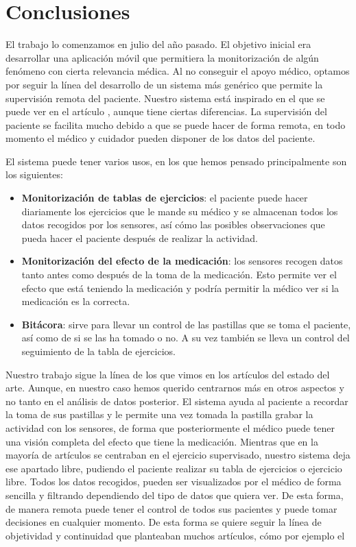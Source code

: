 \section{Conclusiones}
El trabajo lo comenzamos en julio del año pasado. El objetivo inicial era desarrollar una aplicación móvil que permitiera la monitorización de algún fenómeno con cierta relevancia médica. Al no conseguir el apoyo médico, optamos por seguir la línea del desarrollo de un sistema más genérico que permite la supervisión remota del paciente. Nuestro sistema está inspirado en el que se puede ver en el artículo \cite{resumen1}, aunque tiene ciertas diferencias. La supervisión del paciente se facilita mucho debido a que se puede hacer de forma remota, en todo momento el médico y cuidador pueden disponer de los datos del paciente.
\newline

El sistema puede tener varios usos, en los que hemos pensado principalmente son los siguientes:

\begin{itemize}
	\item {\bf Monitorización de tablas de ejercicios}: el paciente puede hacer diariamente los ejercicios que le mande su médico y se almacenan todos los datos recogidos por los sensores, así cómo las posibles observaciones que pueda hacer el paciente después de realizar la actividad.
    \item {\bf Monitorización del efecto de la medicación}: los sensores recogen datos tanto antes como después de la toma de la medicación. Esto permite ver el efecto que está teniendo la medicación y podría permitir la médico ver si la medicación es la correcta.
    \item {\bf Bitácora}: sirve para llevar un control de las pastillas que se toma el paciente, así como de si se las ha tomado o no. A su vez también se lleva un control del seguimiento de la tabla de ejercicios.
\end{itemize}

Nuestro trabajo sigue la línea de los que vimos en los artículos del estado del arte. Aunque, en nuestro caso hemos querido centrarnos más en otros aspectos y no tanto en el análisis de datos posterior. El sistema ayuda al paciente a recordar la toma de sus pastillas y le permite una vez tomada la pastilla grabar la actividad con los sensores, de forma que posteriormente el médico puede tener una visión completa del efecto que tiene la medicación. Mientras que en la mayoría de artículos se centraban en el ejercicio supervisado, nuestro sistema deja ese apartado libre, pudiendo el paciente realizar su tabla de ejercicios o ejercicio libre. Todos los datos recogidos, pueden ser visualizados por el médico de forma sencilla y filtrando dependiendo del tipo de datos que quiera ver. De esta forma, de manera remota puede tener el control de todos sus pacientes y puede tomar decisiones en cualquier momento. De esta forma se quiere seguir la línea de objetividad y continuidad que planteaban muchos artículos, cómo por ejemplo el \cite{resumen2}
\newline

